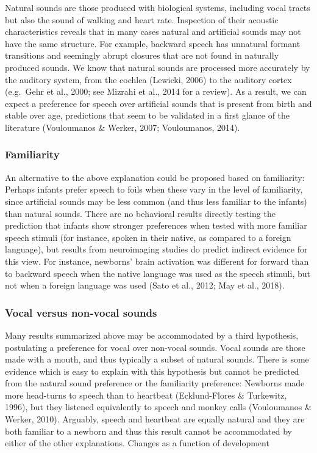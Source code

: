\documentclass[man]{apa6}
\begin{document}
Natural sounds are those produced with biological systems, including
vocal tracts but also the sound of walking and heart rate. Inspection of
their acoustic characteristics reveals that in many cases natural and
artificial sounds may not have the same structure. For example, backward
speech has unnatural formant transitions and seemingly abrupt closures
that are not found in naturally produced sounds. We know that natural
sounds are processed more accurately by the auditory system, from the
cochlea (Lewicki, 2006) to the auditory cortex (e.g.~Gehr et al., 2000;
see Mizrahi et al., 2014 for a review). As a result, we can expect a
preference for speech over artificial sounds that is present from birth
and stable over age, predictions that seem to be validated in a first
glance of the literature (Vouloumanos \& Werker, 2007; Vouloumanos,
2014).

\subsubsection{Familiarity}\label{familiarity}

An alternative to the above explanation could be proposed based on
familiarity: Perhaps infants prefer speech to foils when these vary in
the level of familiarity, since artificial sounds may be less common
(and thus less familiar to the infants) than natural sounds. There are
no behavioral results directly testing the prediction that infants show
stronger preferences when tested with more familiar speech stimuli (for
instance, spoken in their native, as compared to a foreign language),
but results from neuroimaging studies do predict indirect evidence for
this view. For instance, newborns' brain activation was different for
forward than to backward speech when the native language was used as the
speech stimuli, but not when a foreign language was used (Sato et al.,
2012; May et al., 2018).

\subsubsection{Vocal versus non-vocal
sounds}\label{vocal-versus-non-vocal-sounds}

Many results summarized above may be accommodated by a third hypothesis,
postulating a preference for vocal over non-vocal sounds. Vocal sounds
are those made with a mouth, and thus typically a subset of natural
sounds. There is some evidence which is easy to explain with this
hypothesis but cannot be predicted from the natural sound preference or
the familiarity preference: Newborns made more head-turns to speech than
to heartbeat (Ecklund-Flores \& Turkewitz, 1996), but they listened
equivalently to speech and monkey calls (Vouloumanos \& Werker, 2010).
Arguably, speech and heartbeat are equally natural and they are both
familiar to a newborn and thus this result cannot be accommodated by
either of the other explanations. Changes as a function of development
\end{document}
